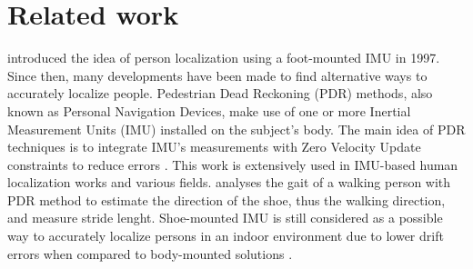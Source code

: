 
\section{Related work}\label{sec:relatedWork}

\cite{hutchings1998system} introduced the idea of person localization using a foot-mounted IMU in 1997. Since then, many developments have been made to find alternative ways to accurately localize people.
Pedestrian Dead Reckoning (PDR) methods, also known as Personal Navigation Devices, make use of one or more Inertial Measurement Units (IMU) installed on the subject's body.
The main idea of PDR techniques is to integrate IMU's measurements with Zero Velocity Update constraints to reduce errors \cite{ojeda2007personal}.
This work is extensively used in IMU-based human localization works and various fields. \cite{kwanmuang2015phd} analyses the gait of a walking person 
with PDR method to estimate the direction of the shoe, thus the walking direction, and measure stride lenght. 
Shoe-mounted IMU is still considered as a possible way to
accurately localize persons in an indoor environment due to lower drift errors when compared to body-mounted solutions \cite{groves2007inertial} . 


